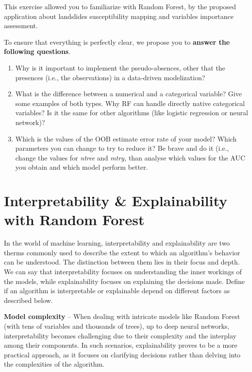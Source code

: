 \documentclass[
]{article}
\begin{document}
This exercise allowed you to familiarize with Random Forest, by the proposed application about landslides susceptibility mapping and variables importance assessment.

To ensure that everything is perfectly clear, we propose you to \textbf{answer the following questions}.

\begin{enumerate}
\def\labelenumi{\arabic{enumi})}
\item
  Why is it important to implement the pseudo-absences, other that the presences (i.e., the observations) in a data-driven modelization?
\item
  What is the difference between a numerical and a categorical variable?
  Give some examples of both types.
  Why RF can handle directly native categorical variables?
  Is it the same for other algorithms (like logistic regression or neural network)?
\item
  Which is the values of the OOB estimate error rate of your model?
  Which parameters you can change to try to reduce it?
  Be brave and do it (i.e., change the values for \emph{ntree} and \emph{mtry,} than analyse which values for the AUC you obtain and which model perform better.
\end{enumerate}

\section{Interpretability \& Explainability with Random Forest}\label{local-rf}

In the world of machine learning, interpretability and explainability are two therms commonly used to describe the extent to which an algorithm's behavior can be understood.
The distinction between them lies in their focus and depth.
We can say that interpretability focuses on understanding the inner workings of the models, while explainability focuses on explaining the decisions made.
Define if an algorithm is interpretable or explainable depend on different factors as described below.

\textbf{Model complexity} -- When dealing with intricate models like Random Forest (with tens of variables and thousands of trees), up to deep neural networks, interpretability becomes challenging due to their complexity and the interplay among their components.
In such scenarios, explainability proves to be a more practical approach, as it focuses on clarifying decisions rather than delving into the complexities of the algorithm.
\end{document}

